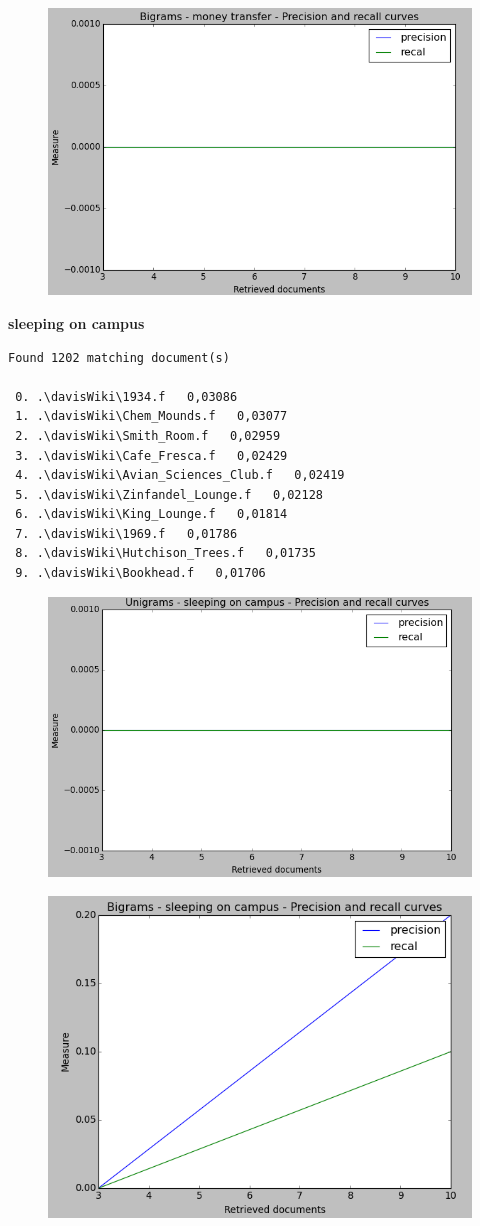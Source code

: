 \begin{figure}[H]
\centering 
\includegraphics[width=0.7\linewidth]{img/bigrams2.png}
\end{figure}


\textbf{sleeping on campus}

\begin{verbatim}
Found 1202 matching document(s)

 0. .\davisWiki\1934.f   0,03086
 1. .\davisWiki\Chem_Mounds.f   0,03077
 2. .\davisWiki\Smith_Room.f   0,02959
 3. .\davisWiki\Cafe_Fresca.f   0,02429
 4. .\davisWiki\Avian_Sciences_Club.f   0,02419
 5. .\davisWiki\Zinfandel_Lounge.f   0,02128
 6. .\davisWiki\King_Lounge.f   0,01814
 7. .\davisWiki\1969.f   0,01786
 8. .\davisWiki\Hutchison_Trees.f   0,01735
 9. .\davisWiki\Bookhead.f   0,01706
\end{verbatim}

\begin{figure}[H]
\centering 
\includegraphics[width=0.7\linewidth]{img/unigrams3.png}
\end{figure}

\begin{figure}[H]
\centering 
\includegraphics[width=0.7\linewidth]{img/bigrams3.png}
\end{figure}

